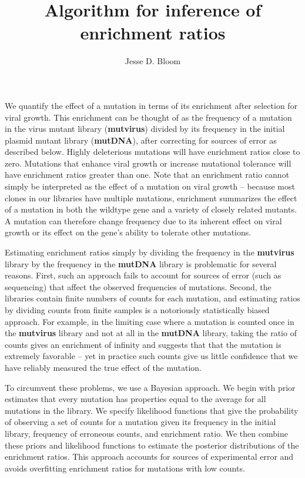 \documentclass[10pt]{article}
\title{Algorithm for inference of enrichment ratios}
\author{Jesse D. Bloom}
\begin{document}
\maketitle

We quantify the effect of a mutation in terms of its enrichment after selection for viral growth. This enrichment can be thought of as the frequency of a mutation in the virus mutant library ({\bf mutvirus}) divided by its frequency in the initial plasmid mutant library ({\bf mutDNA}), after correcting for sources of error as described below. Highly deleterious mutations will have enrichment ratios close to zero. Mutations that enhance viral growth or increase mutational tolerance will have enrichment ratios greater than one. Note that an enrichment ratio cannot simply be interpreted as the effect of a mutation on viral growth -- because most clones in our libraries have multiple mutations, enrichment summarizes the effect of a mutation in both the wildtype gene and a variety of closely related mutants. A mutation can therefore change frequency due to its inherent effect on viral growth or its effect on the gene's ability to tolerate other mutations. 

Estimating enrichment ratios simply by dividing the frequency in the {\bf mutvirus} library by the frequency in the {\bf mutDNA} library is problematic for several reasons. First, such an approach fails to account for sources of error (such as sequencing) that affect the observed frequencies of mutations. Second, the libraries contain finite numbers of counts for each mutation, and estimating ratios by dividing counts from finite samples is a notoriously statistically biased approach. For example, in the limiting case where a mutation is counted once in the {\bf mutvirus} library and not at all in the {\bf mutDNA} library, taking the ratio of counts gives an enrichment of infinity and suggests that that the mutation is extremely favorable -- yet in practice such counts give us little confidence that we have reliably measured the true effect of the mutation.

To circumvent these problems, we use a Bayesian approach. We begin with prior estimates that every mutation has properties equal to the average for all mutations in the library. We specify likelihood functions that give the probability of observing a set of counts for a mutation given its frequency in the initial library, frequency of erroneous counts, and enrichment ratio. We then combine these priors and likelihood functions to estimate the posterior distributions of the enrichment ratios. This approach accounts for sources of experimental error and avoids overfitting enrichment ratios for mutations with low counts. 
\end{document}
